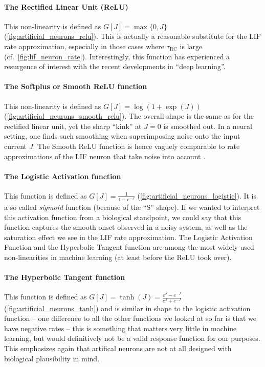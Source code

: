 \documentclass[10pt,letterpaper,oneside]{article}
\begin{document}
\paragraph{The Rectified Linear Unit (ReLU)}
This non-linearity is defined as $G[J] = \max\{0, J\}$ (\cref{fig:artificial_neurons_relu}). This is actually a reasonable substitute for the LIF rate approximation, especially in those cases where $\tau_\mathrm{RC}$ is large (cf.~\cref{fig:lif_neuron_rate}). Interestingly, this function has experienced a resurgence of interest with the recent developments in \enquote{deep learning}.

\paragraph{The Softplus or Smooth ReLU function}
This non-linearity is defined as $G[J] = \log(1 + \exp(J))$ (\cref{fig:artificial_neurons_smooth_relu}). The overall shape is the same as for the rectified linear unit, yet the sharp \enquote{kink} at $J = 0$ is smoothed out. In a neural setting, one finds such smoothing when superimposing noise onto the input current $J$. The Smooth ReLU function is hence vaguely comparable to rate approximations of the LIF neuron that take noise into account \cite{hunsberger2015spiking}.

\paragraph{The Logistic Activation function}
This function is defined as $G[J] = \frac{1}{1 + e^{-J}}$ (\cref{fig:artificial_neurons_logistic}). It is a so called \emph{sigmoid} function (because of the \enquote{S} shape). If we wanted to interpret this activation function from a biological standpoint, we could say that this function captures the smooth onset observed in a noisy system, as well as the saturation effect we see in the LIF rate approximation. The Logistic Activation Function and the Hyperbolic Tangent function are among the most widely used non-linearities in machine learning (at least before the ReLU took over).

\paragraph{The Hyperbolic Tangent function}
This function is defined as $G[J] = \tanh(J) = \frac{e^J - e^{-J}}{e^J + e^{-J}}$ (\cref{fig:artificial_neurons_tanh}) and is similar in shape to the logistic activation function -- one difference to all the other functions we looked at so far is that we have negative rates -- this is something that matters very little in machine learning, but would definitively not be a valid response function for our purposes. This emphasizes again that artifical neurons are not at all designed with biological plausibility in mind.
\end{document}
